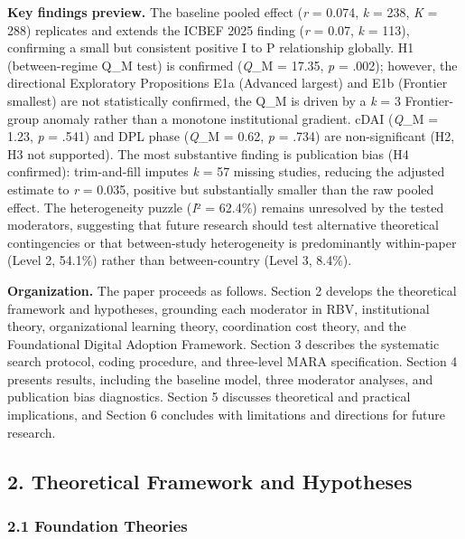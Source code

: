 \documentclass[
  12pt,a4paper]{article}
\begin{document}
\textbf{Key findings preview.} The baseline pooled effect (\emph{r} =
0.074, \emph{k} = 238, \emph{K} = 288) replicates and extends the ICBEF
2025 finding (\emph{r} = 0.07, \emph{k} = 113), confirming a small but
consistent positive I to P relationship globally. H1 (between-regime
Q\_M test) is confirmed (\emph{Q}\_M = 17.35, \emph{p} = .002); however,
the directional Exploratory Propositions E1a (Advanced largest) and E1b
(Frontier smallest) are not statistically confirmed, the Q\_M is driven
by a \emph{k} = 3 Frontier-group anomaly rather than a monotone
institutional gradient. cDAI (\emph{Q}\_M = 1.23, \emph{p} = .541) and
DPL phase (\emph{Q}\_M = 0.62, \emph{p} = .734) are non-significant (H2,
H3 not supported). The most substantive finding is publication bias (H4
confirmed): trim-and-fill imputes \emph{k} = 57 missing studies,
reducing the adjusted estimate to \emph{r} = 0.035, positive but
substantially smaller than the raw pooled effect. The heterogeneity
puzzle (\emph{I}² = 62.4\%) remains unresolved by the tested moderators,
suggesting that future research should test alternative theoretical
contingencies or that between-study heterogeneity is predominantly
within-paper (Level 2, 54.1\%) rather than between-country (Level 3,
8.4\%).

\textbf{Organization.} The paper proceeds as follows. Section 2 develops
the theoretical framework and hypotheses, grounding each moderator in
RBV, institutional theory, organizational learning theory, coordination
cost theory, and the Foundational Digital Adoption Framework. Section 3
describes the systematic search protocol, coding procedure, and
three-level MARA specification. Section 4 presents results, including
the baseline model, three moderator analyses, and publication bias
diagnostics. Section 5 discusses theoretical and practical implications,
and Section 6 concludes with limitations and directions for future
research.

\hypertarget{theoretical-framework-and-hypotheses}{%
\subsection{2. Theoretical Framework and
Hypotheses}\label{theoretical-framework-and-hypotheses}}

\hypertarget{foundation-theories}{%
\subsubsection{2.1 Foundation Theories}\label{foundation-theories}}
\end{document}
